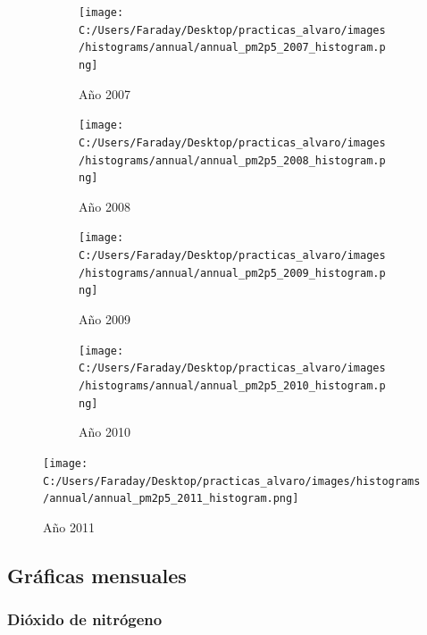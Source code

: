 \documentclass[12pt]{article}
\begin{document}
\begin{figure}[H]
\centering
\begin{subfigure}[h]{0.45\textwidth}
\texttt{[image: C:/Users/Faraday/Desktop/practicas\_alvaro/images/histograms/annual/annual\_pm2p5\_2007\_histogram.png]}
\caption{Año 2007}
\label{fig:hist-ann-4-1}
\end{subfigure}
%
\begin{subfigure}[H]{0.45\textwidth}
\texttt{[image: C:/Users/Faraday/Desktop/practicas\_alvaro/images/histograms/annual/annual\_pm2p5\_2008\_histogram.png]}
\caption{Año 2008}
\label{fig:hist-ann-4-2}
\end{subfigure}
\caption{}
\end{figure}

\begin{figure}[H]
\centering
\begin{subfigure}[h]{0.45\textwidth}
\texttt{[image: C:/Users/Faraday/Desktop/practicas\_alvaro/images/histograms/annual/annual\_pm2p5\_2009\_histogram.png]}
\caption{Año 2009}
\label{fig:hist-ann-4-3}
\end{subfigure}
%
\begin{subfigure}[H]{0.45\textwidth}
\texttt{[image: C:/Users/Faraday/Desktop/practicas\_alvaro/images/histograms/annual/annual\_pm2p5\_2010\_histogram.png]}
\caption{Año 2010}
\label{fig:hist-ann-4-4}
\end{subfigure}
\caption{}
\end{figure}

\begin{figure}[H]
\centering
\texttt{[image: C:/Users/Faraday/Desktop/practicas\_alvaro/images/histograms/annual/annual\_pm2p5\_2011\_histogram.png]}
\label{fig:hist-ann-4-5}
\caption{Año 2011}
\end{figure}

\newpage

\subsection*{Gráficas mensuales}
%

\subsubsection*{Dióxido de nitrógeno}
%
\end{document}
